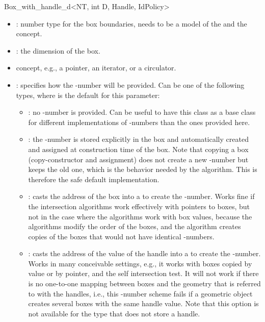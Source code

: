 \begin{ccRefClass}{Box_with_handle_d<NT, int D, Handle, IdPolicy>}
\begin{itemize}
  \item
    : number type for the box boundaries, needs to be a model
    of the  and the  concept.
  \item
    : the dimension of the box.
  \item
     concept, e.g., a pointer, an iterator, or a circulator.
  \item
    : specifies how the -number will be
    provided. Can be one of the following types, where
     is the default for this parameter:
    \begin{itemize}
      \item
        : no -number is provided. Can be useful
        to have this class as a base class for different
        implementations of -numbers than the ones provided
        here.
      \item
        : the -number is stored explicitly in
        the box and automatically created and assigned at construction
        time of the box. Note that copying a box (copy-constructor and
        assignment) does not create a new -number but keeps
        the old one, which is the behavior needed by the
         algorithm. This is therefore
        the safe default implementation. 
      \item
        : casts the address of the box into a
         to create the -number. Works fine 
        if the intersection algorithms work effectively with pointers
        to boxes, but not in the case where the algorithms work with
        box values, because the algorithms modify the order of the
        boxes, and the  algorithm
        creates copies of the boxes that would not have identical
        -numbers.  
      \item
        : casts the address of the value of the
        handle into a  to create the
        -number. Works in many conceivable settings, e.g.,
        it works with boxes copied by value or by pointer, and
        the self intersection test. It will not work if there
        is no one-to-one mapping between boxes and the geometry that
        is referred to with the handles, i.e., this -number
        scheme fails if a geometric object creates several boxes with
        the same handle value. Note that this option is not
        available for the  type
        that does not store a handle.
    \end{itemize}
\end{itemize}


\end{ccRefClass}
